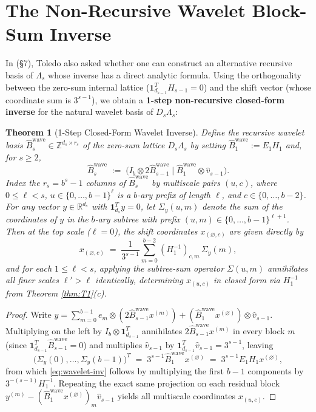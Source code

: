 \documentclass[11pt,a4paper]{article}
\theoremstyle{plain}
\newtheorem{theorem}{Theorem}[section]
\theoremstyle{definition}
\newcommand{\Z}{\mathbb{Z}}
\newcommand{\R}{\mathbb{R}}
\begin{document}
\section{The Non-Recursive Wavelet Block-Sum Inverse}

In \cite{Toledo26} (\S 7), Toledo also asked whether one can construct an alternative recursive basis of $\Lambda_s$ whose inverse has a direct analytic formula. Using the orthogonality between the zero-sum internal lattice ($\mathbf{1}_{d_{s-1}}^T \hat{H}_{s-1} = 0$) and the shift vector (whose coordinate sum is $3^{s-1}$), we obtain a \textbf{1-step non-recursive closed-form inverse} for the natural wavelet basis of $D_s \Lambda_s$:

\begin{theorem}[1-Step Closed-Form Wavelet Inverse]\label{thm:T7}
Define the recursive wavelet basis $\hat{B}_s^{\mathrm{wave}} \in \Z^{d_s \times r_s}$ of the zero-sum lattice $D_s \Lambda_s$ by setting $\hat{B}_1^{\mathrm{wave}} := E_1 H_1$ and, for $s \ge 2$,
\[
\hat{B}_s^{\mathrm{wave}} \;:=\; \big(I_b \otimes 2 \hat{B}_{s-1}^{\mathrm{wave}} \;\big|\; \hat{B}_1^{\mathrm{wave}} \otimes \hat{v}_{s-1}\big).
\]
Index the $r_s = b^s - 1$ columns of $\hat{B}_s^{\mathrm{wave}}$ by multiscale pairs $(u, c)$, where $0 \le \ell < s$, $u \in \{0, \dots, b-1\}^\ell$ is a $b$-ary prefix of length $\ell$, and $c \in \{0, \dots, b-2\}$. For any vector $y \in \R^{d_s}$ with $\mathbf{1}_{d_s}^T y = 0$, let $\Sigma_y(u, m)$ denote the sum of the coordinates of $y$ in the $b$-ary subtree with prefix $(u, m) \in \{0, \dots, b-1\}^{\ell+1}$. Then at the top scale ($\ell = 0$), the shift coordinates $x_{(\varnothing, c)}$ are given directly by
\begin{equation}\label{eq:wavelet-inv}
\boxed{\; x_{(\varnothing, c)} \;=\; \frac{1}{3^{s-1}} \sum_{m=0}^{b-2} (H_1^{-1})_{c,m} \, \Sigma_y(m), \;}
\end{equation}
and for each $1 \le \ell < s$, applying the subtree-sum operator $\Sigma(u, m)$ annihilates all finer scales $\ell' > \ell$ identically, determining $x_{(u, c)}$ in closed form via $H_1^{-1}$ from Theorem \ref{thm:T1}(c).
\end{theorem}

\begin{proof}
Write $y = \sum_{m=0}^{b-1} e_m \otimes (2 \hat{B}_{s-1}^{\mathrm{wave}} x^{(m)}) + (\hat{B}_1^{\mathrm{wave}} x^{(\varnothing)}) \otimes \hat{v}_{s-1}$. Multiplying on the left by $I_b \otimes \mathbf{1}_{d_{s-1}}^T$ annihilates $2 \hat{B}_{s-1}^{\mathrm{wave}} x^{(m)}$ in every block $m$ (since $\mathbf{1}_{d_{s-1}}^T \hat{B}_{s-1}^{\mathrm{wave}} = 0$) and multiplies $\hat{v}_{s-1}$ by $\mathbf{1}_{d_{s-1}}^T \hat{v}_{s-1} = 3^{s-1}$, leaving
\[
\big(\Sigma_y(0), \dots, \Sigma_y(b-1)\big)^T \;=\; 3^{s-1} \hat{B}_1^{\mathrm{wave}} x^{(\varnothing)} \;=\; 3^{s-1} E_1 H_1 x^{(\varnothing)},
\]
from which \eqref{eq:wavelet-inv} follows by multiplying the first $b-1$ components by $3^{-(s-1)} H_1^{-1}$. Repeating the exact same projection on each residual block $y^{(m)} - (\hat{B}_1^{\mathrm{wave}} x^{(\varnothing)})_m \hat{v}_{s-1}$ yields all multiscale coordinates $x_{(u,c)}$.
\end{proof}
\end{document}
